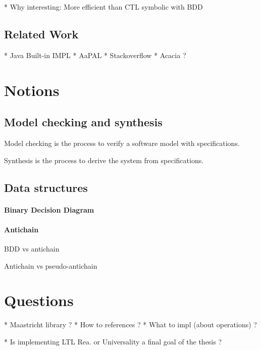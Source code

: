 \documentclass[letterpaper]{memoir}
\begin{document}
* Why interesting: More efficient than CTL symbolic with BDD

\subsection{Related Work}

* Java Built-in IMPL
* AaPAL
* Stackoverflow
* Acacia ?

\section{Notions}

\subsection{Model checking and synthesis}

Model checking is the process to verify a software model with
specifications.

Synthesis is the process to derive the system from specifications.

\cite{bohyphd}

\cite{ltl_rea}
\subsection{Data structures}

\paragraph{Binary Decision Diagram}

\paragraph{Antichain}

BDD vs antichain

Antichain vs pseudo-antichain

\section{Questions}

* Maastricht library ? \cite{acacia} \cite{aapal}
* How to references ?
* What to impl (about operations) ?

* Is implementing LTL Rea. or Universality a final goal of the thesis ?



\end{document}
